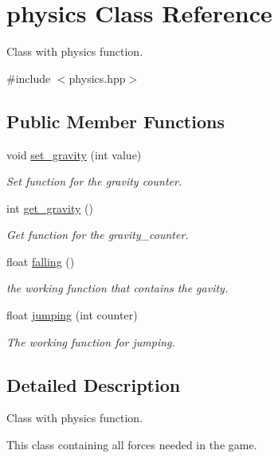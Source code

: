 \hypertarget{classphysics}{}\section{physics Class Reference}
\label{classphysics}


Class with physics function.  




{\ttfamily \#include $<$physics.\+hpp$>$}

\subsection*{Public Member Functions}
\begin{DoxyCompactItemize}
\item 
void \hyperlink{classphysics_a8b0dff646c304dee3cb5c095d821dc87}{set\+\_\+gravity} (int value)
\begin{DoxyCompactList}\small\item\em Set function for the gravity counter. \end{DoxyCompactList}\item 
int \hyperlink{classphysics_a3c4c6084fe0652b0bfd35afa5daa1c1e}{get\+\_\+gravity} ()
\begin{DoxyCompactList}\small\item\em Get function for the gravity\+\_\+counter. \end{DoxyCompactList}\item 
float \hyperlink{classphysics_acca1ee2fb8b760b6e4ee61ae7c2ee3da}{falling} ()
\begin{DoxyCompactList}\small\item\em the working function that contains the gavity. \end{DoxyCompactList}\item 
float \hyperlink{classphysics_aaf1c57aa6e35b9c83ccbfdfa8c18468c}{jumping} (int counter)
\begin{DoxyCompactList}\small\item\em The working function for jumping. \end{DoxyCompactList}\end{DoxyCompactItemize}


\subsection{Detailed Description}
Class with physics function. 

This class containing all forces needed in the game.

